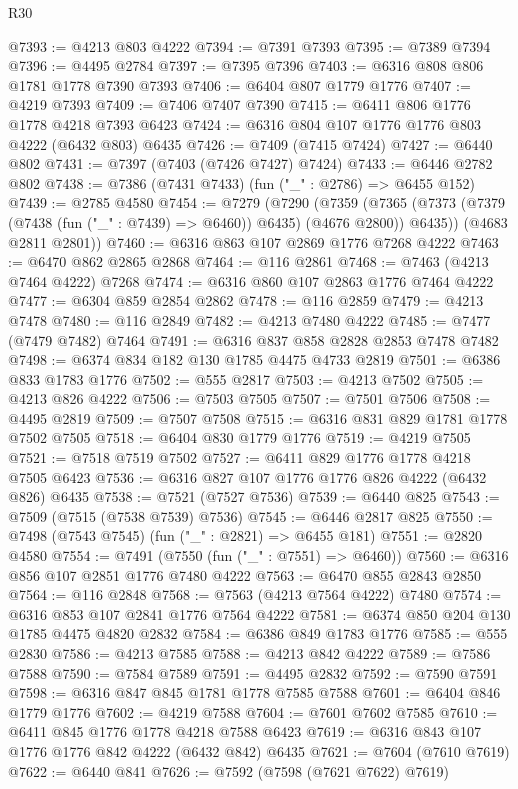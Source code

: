 \begin{lexlean}{R30}
\begin{coremodule}
@7393 := @4213 @803 @4222
@7394 := @7391 @7393
@7395 := @7389 @7394
@7396 := @4495 @2784
@7397 := @7395 @7396
@7403 := @6316 @808 @806 @1781 @1778 @7390 @7393
@7406 := @6404 @807 @1779 @1776
@7407 := @4219 @7393
@7409 := @7406 @7407 @7390
@7415 := @6411 @806 @1776 @1778 @4218 @7393 @6423
@7424 := @6316 @804 @107 @1776 @1776 @803 @4222 (@6432 @803) @6435
@7426 := @7409 (@7415 @7424)
@7427 := @6440 @802
@7431 := @7397 (@7403 (@7426 @7427) @7424)
@7433 := @6446 @2782 @802
@7438 := @7386 (@7431 @7433) (fun ("_" : @2786) => @6455 @152)
@7439 := @2785 @4580
@7454 := @7279
    (@7290
      (@7359 (@7365 (@7373 (@7379 (@7438 (fun ("_" : @7439) => @6460)) @6435) (@4676 @2800)) @6435))
      (@4683 @2811 @2801))
@7460 := @6316 @863 @107 @2869 @1776 @7268 @4222
@7463 := @6470 @862 @2865 @2868
@7464 := @116 @2861
@7468 := @7463 (@4213 @7464 @4222) @7268
@7474 := @6316 @860 @107 @2863 @1776 @7464 @4222
@7477 := @6304 @859 @2854 @2862
@7478 := @116 @2859
@7479 := @4213 @7478
@7480 := @116 @2849
@7482 := @4213 @7480 @4222
@7485 := @7477 (@7479 @7482) @7464
@7491 := @6316 @837 @858 @2828 @2853 @7478 @7482
@7498 := @6374 @834 @182 @130 @1785 @4475 @4733 @2819
@7501 := @6386 @833 @1783 @1776
@7502 := @555 @2817
@7503 := @4213 @7502
@7505 := @4213 @826 @4222
@7506 := @7503 @7505
@7507 := @7501 @7506
@7508 := @4495 @2819
@7509 := @7507 @7508
@7515 := @6316 @831 @829 @1781 @1778 @7502 @7505
@7518 := @6404 @830 @1779 @1776
@7519 := @4219 @7505
@7521 := @7518 @7519 @7502
@7527 := @6411 @829 @1776 @1778 @4218 @7505 @6423
@7536 := @6316 @827 @107 @1776 @1776 @826 @4222 (@6432 @826) @6435
@7538 := @7521 (@7527 @7536)
@7539 := @6440 @825
@7543 := @7509 (@7515 (@7538 @7539) @7536)
@7545 := @6446 @2817 @825
@7550 := @7498 (@7543 @7545) (fun ("_" : @2821) => @6455 @181)
@7551 := @2820 @4580
@7554 := @7491 (@7550 (fun ("_" : @7551) => @6460))
@7560 := @6316 @856 @107 @2851 @1776 @7480 @4222
@7563 := @6470 @855 @2843 @2850
@7564 := @116 @2848
@7568 := @7563 (@4213 @7564 @4222) @7480
@7574 := @6316 @853 @107 @2841 @1776 @7564 @4222
@7581 := @6374 @850 @204 @130 @1785 @4475 @4820 @2832
@7584 := @6386 @849 @1783 @1776
@7585 := @555 @2830
@7586 := @4213 @7585
@7588 := @4213 @842 @4222
@7589 := @7586 @7588
@7590 := @7584 @7589
@7591 := @4495 @2832
@7592 := @7590 @7591
@7598 := @6316 @847 @845 @1781 @1778 @7585 @7588
@7601 := @6404 @846 @1779 @1776
@7602 := @4219 @7588
@7604 := @7601 @7602 @7585
@7610 := @6411 @845 @1776 @1778 @4218 @7588 @6423
@7619 := @6316 @843 @107 @1776 @1776 @842 @4222 (@6432 @842) @6435
@7621 := @7604 (@7610 @7619)
@7622 := @6440 @841
@7626 := @7592 (@7598 (@7621 @7622) @7619)

\end{coremodule}
\end{lexlean}
